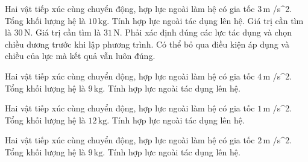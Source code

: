\begin{ex}
Hai vật tiếp xúc cùng chuyển động, hợp lực ngoài làm hệ có gia tốc $3\,\text{m}$ /s^2. Tổng khối lượng hệ là $10\,\text{kg}$. Tính hợp lực ngoài tác dụng lên hệ.
\choiceTF
{\True Giá trị cần tìm là $30\,\text{N}$.}
{Giá trị cần tìm là $31\,\text{N}$.}
{\True Phải xác định đúng các lực tác dụng và chọn chiều dương trước khi lập phương trình.}
{Có thể bỏ qua điều kiện áp dụng và chiều của lực mà kết quả vẫn luôn đúng.}
\end{ex}

\begin{ex}
Hai vật tiếp xúc cùng chuyển động, hợp lực ngoài làm hệ có gia tốc $4\,\text{m}$ /s^2. Tổng khối lượng hệ là $9\,\text{kg}$. Tính hợp lực ngoài tác dụng lên hệ.
\end{ex}

\begin{ex}
Hai vật tiếp xúc cùng chuyển động, hợp lực ngoài làm hệ có gia tốc $1\,\text{m}$ /s^2. Tổng khối lượng hệ là $12\,\text{kg}$. Tính hợp lực ngoài tác dụng lên hệ.
\end{ex}

\begin{ex}
Hai vật tiếp xúc cùng chuyển động, hợp lực ngoài làm hệ có gia tốc $2\,\text{m}$ /s^2. Tổng khối lượng hệ là $9\,\text{kg}$. Tính hợp lực ngoài tác dụng lên hệ.
\end{ex}

